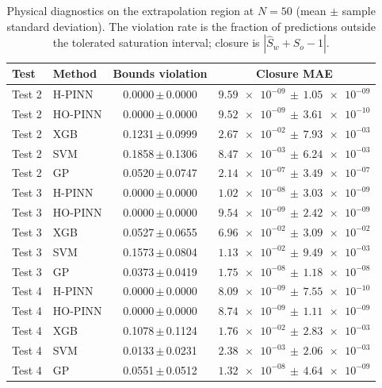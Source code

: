 \begin{table}[!htbp]
\centering
\small
\caption{Physical diagnostics on the extrapolation region at $N=50$ (mean $\pm$ sample standard deviation). The violation rate is the fraction of predictions outside the tolerated saturation interval; closure is $|\widehat S_w+\widehat S_o-1|$.}
\label{tab:physical_diagnostics}
\begin{tabular}{llcc}
\toprule
Test & Method & Bounds violation & Closure MAE \\
\midrule
Test 2 & H-PINN & 0.0000\,$\pm$\,0.0000 & $\num{9.59e-09}\,\pm\,\num{1.05e-09}$ \\
Test 2 & HO-PINN & 0.0000\,$\pm$\,0.0000 & $\num{9.52e-09}\,\pm\,\num{3.61e-10}$ \\
Test 2 & XGB & 0.1231\,$\pm$\,0.0999 & $\num{2.67e-02}\,\pm\,\num{7.93e-03}$ \\
Test 2 & SVM & 0.1858\,$\pm$\,0.1306 & $\num{8.47e-03}\,\pm\,\num{6.24e-03}$ \\
Test 2 & GP & 0.0520\,$\pm$\,0.0747 & $\num{2.14e-07}\,\pm\,\num{3.49e-07}$ \\
\midrule
Test 3 & H-PINN & 0.0000\,$\pm$\,0.0000 & $\num{1.02e-08}\,\pm\,\num{3.03e-09}$ \\
Test 3 & HO-PINN & 0.0000\,$\pm$\,0.0000 & $\num{9.54e-09}\,\pm\,\num{2.42e-09}$ \\
Test 3 & XGB & 0.0527\,$\pm$\,0.0655 & $\num{6.96e-02}\,\pm\,\num{3.09e-02}$ \\
Test 3 & SVM & 0.1573\,$\pm$\,0.0804 & $\num{1.13e-02}\,\pm\,\num{9.49e-03}$ \\
Test 3 & GP & 0.0373\,$\pm$\,0.0419 & $\num{1.75e-08}\,\pm\,\num{1.18e-08}$ \\
\midrule
Test 4 & H-PINN & 0.0000\,$\pm$\,0.0000 & $\num{8.09e-09}\,\pm\,\num{7.55e-10}$ \\
Test 4 & HO-PINN & 0.0000\,$\pm$\,0.0000 & $\num{8.74e-09}\,\pm\,\num{1.11e-09}$ \\
Test 4 & XGB & 0.1078\,$\pm$\,0.1124 & $\num{1.76e-02}\,\pm\,\num{2.83e-03}$ \\
Test 4 & SVM & 0.0133\,$\pm$\,0.0231 & $\num{2.38e-03}\,\pm\,\num{2.06e-03}$ \\
Test 4 & GP & 0.0551\,$\pm$\,0.0512 & $\num{1.32e-08}\,\pm\,\num{4.64e-09}$ \\
\bottomrule
\end{tabular}
\end{table}
